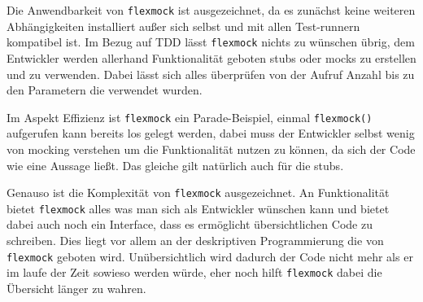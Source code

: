 Die Anwendbarkeit von \lstinline{flexmock} ist ausgezeichnet, da es zunächst
keine weiteren Abhängigkeiten installiert außer sich selbst und mit allen
Test-runnern kompatibel ist. Im Bezug auf TDD lässt \lstinline{flexmock} nichts
zu wünschen übrig, dem Entwickler werden allerhand Funktionalität geboten
\Glspl{stub} oder \Glspl{mock} zu erstellen und zu verwenden. Dabei lässt sich
alles überprüfen von der Aufruf Anzahl bis zu den Parametern die verwendet
wurden.

Im Aspekt Effizienz ist \lstinline{flexmock} ein Parade-Beispiel, einmal
\lstinline{flexmock()} aufgerufen kann bereits los gelegt werden, dabei muss der
Entwickler selbst wenig von \gls{mock}ing verstehen um die Funktionalität nutzen
zu können, da sich der Code wie eine Aussage ließt. Das gleiche gilt natürlich
auch für die \Glspl{stub}.

Genauso ist die Komplexität von \lstinline{flexmock} ausgezeichnet. An
Funktionalität bietet \lstinline{flexmock} alles was man sich als Entwickler
wünschen kann und bietet dabei auch noch ein Interface, dass es ermöglicht
übersichtlichen Code zu schreiben. Dies liegt vor allem an der deskriptiven
Programmierung die von \lstinline{flexmock} geboten wird. Unübersichtlich
wird dadurch der Code nicht mehr als er im laufe der Zeit sowieso werden würde,
eher noch hilft \lstinline{flexmock} dabei die Übersicht länger zu wahren.